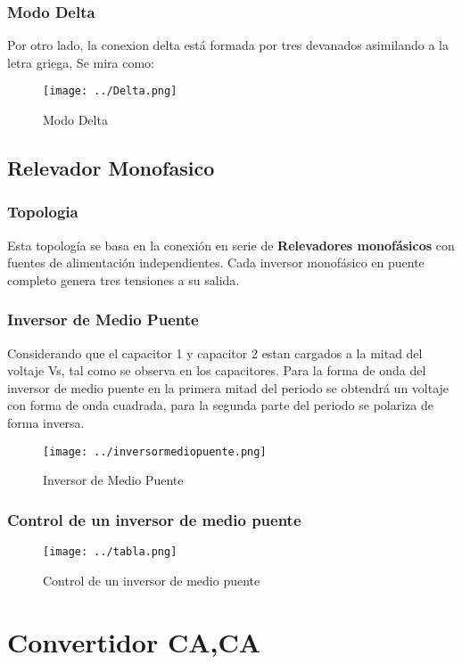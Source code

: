 \documentclass[11pt,a4paper]{article}
\begin{document}
\subsubsection{Modo Delta}
Por otro lado, la conexion delta está formada por tres devanados asimilando a la letra  griega, Se mira como:

\begin{figure}[h]
\centering
\texttt{[image: ../Delta.png]}     
\caption{Modo Delta} 
\end{figure} 


\subsection{Relevador Monofasico}
\subsubsection{Topologia}
Esta  topología se basa en la conexión en serie de \textbf{Relevadores  monofásicos} con fuentes de alimentación independientes. Cada inversor monofásico en puente completo  genera tres tensiones a su salida.

\subsubsection{Inversor de Medio Puente}
Considerando que el capacitor 1 y capacitor 2 estan cargados a la mitad del voltaje Vs, tal como se observa en los  capacitores. Para la forma de onda del inversor de  medio  puente en la primera mitad del periodo se obtendrá un voltaje con forma de onda  cuadrada, para la segunda parte del periodo se polariza de forma inversa.

\begin{figure}[h]
\centering
\texttt{[image: ../inversormediopuente.png]}      
\caption{Inversor de Medio Puente} 
\end{figure} 

\subsubsection{Control de un inversor de medio puente}

\begin{figure}[h]
\centering
\texttt{[image: ../tabla.png]}     
\caption{Control de un inversor de medio puente} 
\end{figure} 

\section{Convertidor CA,CA}
\end{document}
